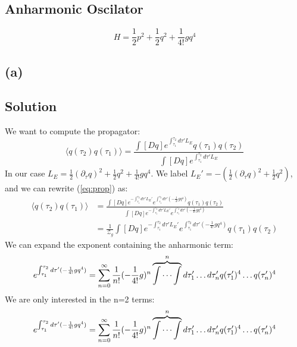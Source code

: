 \documentclass{article}
\begin{document}
\subsection*{Anharmonic Oscilator}
\begin{equation*}
    H=\frac{1}{2}p^2+\frac{1}{2}q^2+\frac{1}{4!}gq^4
\end{equation*}
\subsection*{(a)}
\subsection*{Solution}
We want to compute the propagator:\\
\begin{equation} \label{eq:prop}
    \langle q(\tau_2)q(\tau_1)\rangle=\frac{\int [Dq]e^{\int_{\tau_1}^{\tau_2}d\tau'L_E}q(\tau_1)q(\tau_2)}{\int [Dq]e^{\int_{\tau_1}^{\tau_2}d\tau'L_E}}
\end{equation}
In our case $L_E=\frac{1}{2}(\partial_\tau q)^2+\frac{1}{2}q^2+\frac{1}{4!}gq^4$. We label $L_E'=-(\frac{1}{2}(\partial_\tau q)^2+\frac{1}{2}q^2)$, and we can rewrite (\ref{eq:prop}) as:
\begin{equation} 
\begin{split}
    \langle q(\tau_2)q(\tau_1)\rangle & 
    =\frac{\int [Dq]e^{-\int_{\tau_1}^{\tau_2}d\tau'L_E'}e^{\int_{\tau_1}^{\tau_2}d\tau' (-\frac{1}{4!}gq^4)}q(\tau_1)q(\tau_2)}{\int [Dq]e^{-\int_{\tau_1}^{\tau_2}d\tau'L_E'}e^{\int_{\tau_1}^{\tau_2}d\tau' (-\frac{1}{4!}gq^4)}}\\
    &=\frac{1}{\mathcal{Z}_g}\int [Dq]e^{-\int_{\tau_1}^{\tau_2}d\tau'L_E'}e^{\int_{\tau_1}^{\tau_2}d\tau' (-\frac{1}{4!}gq^4)}q(\tau_1)q(\tau_2)
\end{split}
\end{equation}
We can expand the exponent containing the anharmonic term: 
\begin{equation*}
    e^{\int_{\tau_1}^{\tau_2}d\tau' (-\frac{1}{4!}gq^4)}=
    \sum_{n=0}^{\infty}\frac{1}{n!}(-\frac{1}{4!}g)^n\overbrace{\idotsint}^n d\tau_1'\dots d\tau_n' q(\tau_1')^4\dots q(\tau_n')^4
\end{equation*}
We are only interested in the n=2 terms:
\begin{equation*}
    e^{\int_{\tau_1}^{\tau_2}d\tau' (-\frac{1}{4!}gq^4)}=
    \sum_{n=0}^{\infty}\frac{1}{n!}(-\frac{1}{4!}g)^n\overbrace{\idotsint}^n d\tau_1'\dots d\tau_n' q(\tau_1')^4\dots q(\tau_n')^4
\end{equation*}
\end{document}
